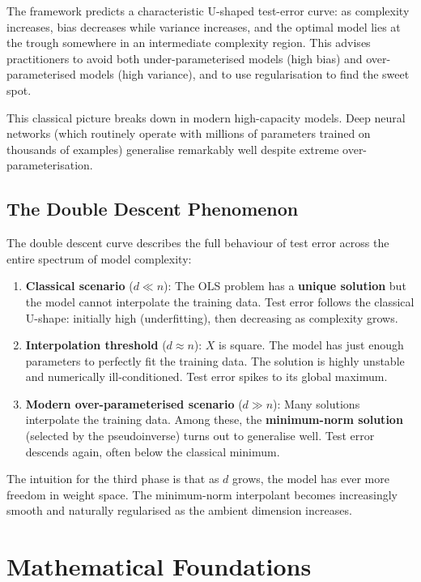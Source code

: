 \documentclass[12pt, a4paper]{article}
\begin{document}
The framework predicts a characteristic U-shaped test-error curve: as complexity increases, bias decreases while variance increases, and the optimal model lies at the trough somewhere in an intermediate complexity region. This advises practitioners to avoid both under-parameterised models (high bias) and over-parameterised models (high variance), and to use regularisation to find the sweet spot.

This classical picture breaks down in modern high-capacity models. Deep neural networks (which routinely operate with millions of parameters trained on thousands of examples) generalise remarkably well despite extreme over-parameterisation.

\subsection{The Double Descent Phenomenon}

The double descent curve describes the full behaviour of test error across the entire spectrum of model complexity:

\begin{enumerate}
  \item \textbf{Classical scenario} ($d \ll n$): The OLS problem has a \textbf{unique solution} but the model cannot interpolate the training data. Test error follows the classical U-shape: initially high (underfitting), then decreasing as complexity grows.
  \item \textbf{Interpolation threshold} ($d \approx n$): $X$ is square. The model has just enough parameters to perfectly fit the training data. The solution is highly unstable and numerically ill-conditioned. Test error spikes to its global maximum.
  \item \textbf{Modern over-parameterised scenario} ($d \gg n$): Many solutions interpolate the training data. Among these, the \textbf{minimum-norm solution} (selected by the pseudoinverse) turns out to generalise well. Test error descends again, often below the classical minimum.
\end{enumerate}

The intuition for the third phase is that as $d$ grows, the model has ever more freedom in weight space. The minimum-norm interpolant becomes increasingly smooth and naturally regularised as the ambient dimension increases.

\section{Mathematical Foundations}
\end{document}

